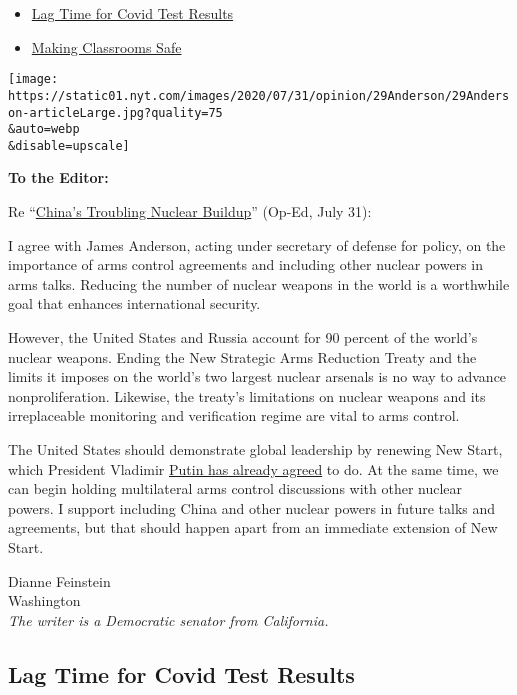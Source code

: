 \begin{itemize}
\tightlist
\item
  \protect\hyperlink{link-8b8bdd5}{Lag Time for Covid Test Results}
\item
  \protect\hyperlink{link-7c46b27b}{Making Classrooms Safe}
\end{itemize}

\texttt{[image: https://static01.nyt.com/images/2020/07/31/opinion/29Anderson/29Anderson-articleLarge.jpg?quality=75\\\&auto=webp\\\&disable=upscale]}

\textbf{To the Editor:}

Re
``\href{https://www.nytimes.com/2020/07/29/opinion/russia-china-nuclear-weapons.html}{China's
Troubling Nuclear Buildup}'' (Op-Ed, July 31):

I agree with James Anderson, acting under secretary of defense for
policy, on the importance of arms control agreements and including other
nuclear powers in arms talks. Reducing the number of nuclear weapons in
the world is a worthwhile goal that enhances international security.

However, the United States and Russia account for 90 percent of the
world's nuclear weapons. Ending the New Strategic Arms Reduction Treaty
and the limits it imposes on the world's two largest nuclear arsenals is
no way to advance nonproliferation. Likewise, the treaty's limitations
on nuclear weapons and its irreplaceable monitoring and verification
regime are vital to arms control.

The United States should demonstrate global leadership by renewing New
Start, which President Vladimir
\href{https://www.armscontrol.org/blog/2019-12-19/us-russian-nuclear-arms-control}{Putin
has already agreed} to do. At the same time, we can begin holding
multilateral arms control discussions with other nuclear powers. I
support including China and other nuclear powers in future talks and
agreements, but that should happen apart from an immediate extension of
New Start.

Dianne Feinstein\\
Washington\\
\emph{The writer is a Democratic senator from California.}

\hypertarget{lag-time-for-covid-test-results}{%
\subsection{Lag Time for Covid Test
Results}\label{lag-time-for-covid-test-results}}

